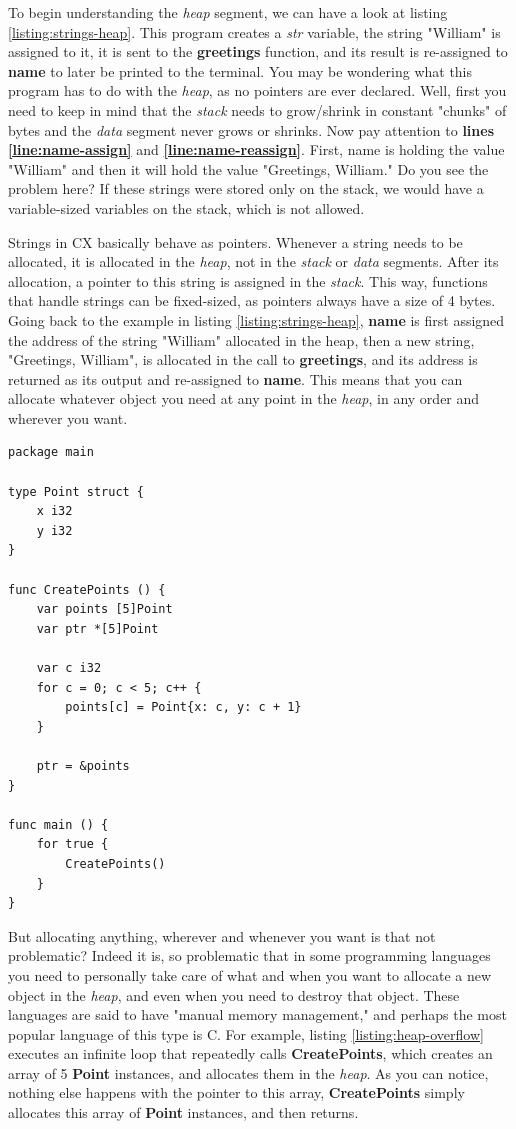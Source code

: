 \documentclass[11pt,fleqn,openany]{book} %
\begin{document}
To begin understanding the \emph{heap} segment, we can have a look at listing \ref{listing:strings-heap}. This program creates a \emph{str} variable, the string "William" is assigned to it, it is sent to the \textbf{greetings} function, and its result is re-assigned to \textbf{name} to later be printed to the terminal. You may be wondering what this program has to do with the \emph{heap}, as no pointers are ever declared. Well, first you need to keep in mind that the \emph{stack} needs to grow/shrink in constant "chunks" of bytes and the \emph{data} segment never grows or shrinks. Now pay attention to \textbf{lines \ref{line:name-assign}} and \textbf{\ref{line:name-reassign}}. First, name is holding the value "William" and then it will hold the value "Greetings, William." Do you see the problem here? If these strings were stored only on the stack, we would have a variable-sized variables on the stack, which is not allowed.

Strings in CX basically behave as pointers. Whenever a string needs to be allocated, it is allocated in the \emph{heap}, not in the \emph{stack} or \emph{data} segments. After its allocation, a pointer to this string is assigned in the \emph{stack}. This way, functions that handle strings can be fixed-sized, as pointers always have a size of 4 bytes. Going back to the example in listing \ref{listing:strings-heap}, \textbf{name} is first assigned the address of the string "William" allocated in the heap, then a new string, "Greetings, William", is allocated in the call to \textbf{greetings}, and its address is returned as its output and re-assigned to \textbf{name}. This means that you can allocate whatever object you need at any point in the \emph{heap}, in any order and wherever you want.

\begin{lstlisting}[caption={Heap overflow},captionpos=b,label={listing:heap-overflow}]
package main

type Point struct {
	x i32
	y i32
}

func CreatePoints () {
	var points [5]Point
	var ptr *[5]Point
	
	var c i32
	for c = 0; c < 5; c++ {
		points[c] = Point{x: c, y: c + 1}
	}

	ptr = &points
}

func main () {
	for true {
		CreatePoints()
	}
}
\end{lstlisting}

But allocating anything, wherever and whenever you want is that not problematic? Indeed it is, so problematic that in some programming languages you need to personally take care of what and when you want to allocate a new object in the \emph{heap}, and even when you need to destroy that object. These languages are said to have "manual memory management," and perhaps the most popular language of this type is C. For example, listing \ref{listing:heap-overflow} executes an infinite loop that repeatedly calls \textbf{CreatePoints}, which creates an array of 5 \textbf{Point} instances, and allocates them in the \emph{heap}. As you can notice, nothing else happens with the pointer to this array, \textbf{CreatePoints} simply allocates this array of \textbf{Point} instances, and then returns.
\end{document}
